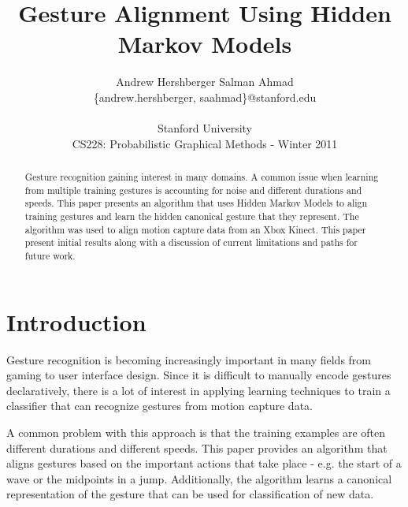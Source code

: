 \documentclass{article}
\title{Gesture Alignment Using Hidden Markov Models}
\author{
Andrew Hershberger
\quad Salman Ahmad \\
\{andrew.hershberger, saahmad\}@stanford.edu
\\\\
Stanford University\\
CS228: Probabilistic Graphical Methods - Winter 2011\\
}
\begin{document}
\maketitle

\begin{abstract}

Gesture recognition gaining interest in many domains. A common issue when
learning from multiple training gestures is accounting for noise and different
durations and speeds. This paper presents an algorithm that uses Hidden Markov
Models to align training gestures and learn the hidden canonical gesture that
they represent. The algorithm was used to align motion capture data from an
Xbox Kinect. This paper present initial results along with a discussion of
current limitations and paths for future work.

\end{abstract}

\section{Introduction}

Gesture recognition is becoming increasingly important in many fields from
gaming to user interface design. Since it is difficult to manually encode
gestures declaratively, there is a lot of interest in applying learning
techniques to train a classifier that can recognize gestures from motion
capture data.

A common problem with this approach is that the training examples are often
different durations and different speeds. This paper provides an algorithm
that aligns gestures based on the important actions that take place - e.g. the
start of a wave or the midpoints in a jump. Additionally, the algorithm
learns a canonical representation of the gesture that can be used for
classification of new data.
\end{document}
